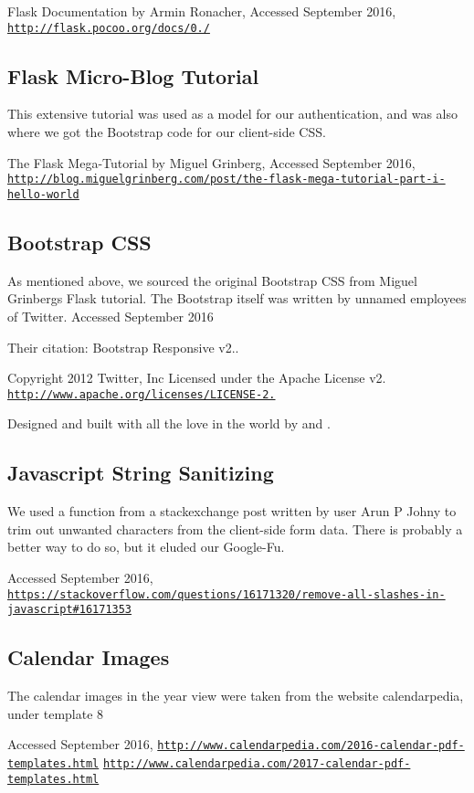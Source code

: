 Flask Documentation by Armin Ronacher, Accessed September 2016, \href{http://flask.pocoo.org/docs/0.11/}{\tt http\+://flask.\+pocoo.\+org/docs/0./}\hypertarget{Citations_five}{}\subsection{Flask Micro-\/\+Blog Tutorial}\label{Citations_five}
This extensive tutorial was used as a model for our authentication, and was also where we got the Bootstrap code for our client-\/side C\+SS.

The Flask Mega-\/\+Tutorial by Miguel Grinberg, Accessed September 2016, \href{http://blog.miguelgrinberg.com/post/the-flask-mega-tutorial-part-i-hello-world}{\tt http\+://blog.\+miguelgrinberg.\+com/post/the-\/flask-\/mega-\/tutorial-\/part-\/i-\/hello-\/world}\hypertarget{Citations_six}{}\subsection{Bootstrap C\+SS}\label{Citations_six}
As mentioned above, we sourced the original Bootstrap C\+SS from Miguel Grinberg\textquotesingle{}s Flask tutorial. The Bootstrap itself was written by unnamed employees of Twitter. Accessed September 2016

Their citation\+: Bootstrap Responsive v2..

Copyright 2012 Twitter, Inc Licensed under the Apache License v2. \href{http://www.apache.org/licenses/LICENSE-2.0}{\tt http\+://www.\+apache.\+org/licenses/\+L\+I\+C\+E\+N\+S\+E-\/2.}

Designed and built with all the love in the world  by  and .\hypertarget{Citations_seven}{}\subsection{Javascript String Sanitizing}\label{Citations_seven}
We used a function from a stackexchange post written by user \textquotesingle{}Arun P Johny\textquotesingle{} to trim out unwanted characters from the client-\/side form data. There is probably a better way to do so, but it eluded our Google-\/\+Fu.

Accessed September 2016, \href{https://stackoverflow.com/questions/16171320/remove-all-slashes-in-javascript#16171353}{\tt https\+://stackoverflow.\+com/questions/16171320/remove-\/all-\/slashes-\/in-\/javascript\#16171353}\hypertarget{Citations_eight}{}\subsection{Calendar Images}\label{Citations_eight}
The calendar images in the year view were taken from the website calendarpedia, under template 8

Accessed September 2016, \href{http://www.calendarpedia.com/2016-calendar-pdf-templates.html}{\tt http\+://www.\+calendarpedia.\+com/2016-\/calendar-\/pdf-\/templates.\+html} \href{http://www.calendarpedia.com/2017-calendar-pdf-templates.html}{\tt http\+://www.\+calendarpedia.\+com/2017-\/calendar-\/pdf-\/templates.\+html} 